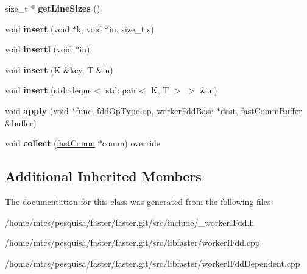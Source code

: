\begin{DoxyCompactItemize}
\item 
\hypertarget{classfaster_1_1__workerIFdd_a4e2b03bca6178ed85f0cbdb65418aab2}{}size\+\_\+t $\ast$ {\bfseries get\+Line\+Sizes} ()\label{classfaster_1_1__workerIFdd_a4e2b03bca6178ed85f0cbdb65418aab2}

\item 
\hypertarget{classfaster_1_1__workerIFdd_aa806f1fef09dbeaaca74b09821e60935}{}void {\bfseries insert} (void $\ast$k, void $\ast$in, size\+\_\+t s)\label{classfaster_1_1__workerIFdd_aa806f1fef09dbeaaca74b09821e60935}

\item 
\hypertarget{classfaster_1_1__workerIFdd_a0c1716a3b4fb62fa1c4c9ffe95761ef4}{}void {\bfseries insertl} (void $\ast$in)\label{classfaster_1_1__workerIFdd_a0c1716a3b4fb62fa1c4c9ffe95761ef4}

\item 
\hypertarget{classfaster_1_1__workerIFdd_ac248aade1f81e85a4f8a48ba8b6fb9b7}{}void {\bfseries insert} (K \&key, T \&in)\label{classfaster_1_1__workerIFdd_ac248aade1f81e85a4f8a48ba8b6fb9b7}

\item 
\hypertarget{classfaster_1_1__workerIFdd_a02d3affac82eaf9e1fe524e5cbcd44d1}{}void {\bfseries insert} (std\+::deque$<$ std\+::pair$<$ K, T $>$ $>$ \&in)\label{classfaster_1_1__workerIFdd_a02d3affac82eaf9e1fe524e5cbcd44d1}

\item 
\hypertarget{classfaster_1_1__workerIFdd_aa9bd2045e6a85cd39f868ad50fbcb5c4}{}void {\bfseries apply} (void $\ast$func, fdd\+Op\+Type op, \hyperlink{classfaster_1_1workerFddBase}{worker\+Fdd\+Base} $\ast$dest, \hyperlink{classfaster_1_1fastCommBuffer}{fast\+Comm\+Buffer} \&buffer)\label{classfaster_1_1__workerIFdd_aa9bd2045e6a85cd39f868ad50fbcb5c4}

\item 
\hypertarget{classfaster_1_1__workerIFdd_a256bac01a1de34d3debeca359783f9f6}{}void {\bfseries collect} (\hyperlink{classfaster_1_1fastComm}{fast\+Comm} $\ast$comm) override\label{classfaster_1_1__workerIFdd_a256bac01a1de34d3debeca359783f9f6}

\end{DoxyCompactItemize}
\subsection*{Additional Inherited Members}


The documentation for this class was generated from the following files\+:\begin{DoxyCompactItemize}
\item 
/home/mtcs/pesquisa/faster/faster.\+git/src/include/\+\_\+worker\+I\+Fdd.\+h\item 
/home/mtcs/pesquisa/faster/faster.\+git/src/libfaster/worker\+I\+Fdd.\+cpp\item 
/home/mtcs/pesquisa/faster/faster.\+git/src/libfaster/worker\+I\+Fdd\+Dependent.\+cpp\end{DoxyCompactItemize}
